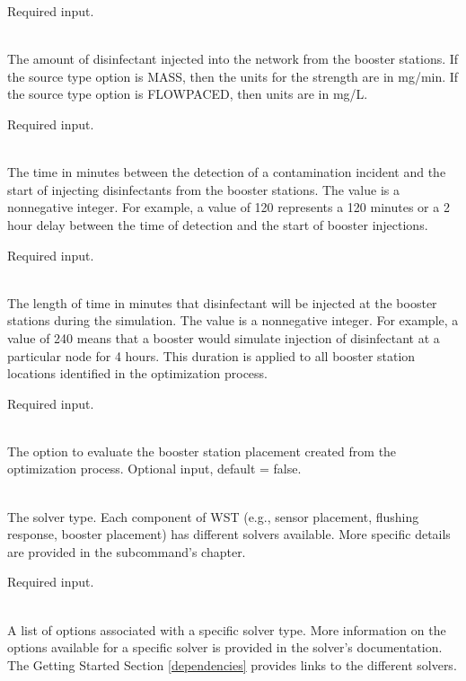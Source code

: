 \begin{description}[topsep=0pt,parsep=0.5em,itemsep=-0.4em]
\begin{description}[topsep=0pt,parsep=0.5em,itemsep=-0.4em]
                Required input.
    \item[{strength}]\hfill
\\The amount of disinfectant injected into the network from the booster stations.  
                If the source type option is MASS, then the units for the strength are in mg/min.  
                If the source type option is FLOWPACED, then units are in mg/L.
                
                Required input.
    \item[{response time}]\hfill
\\The time in minutes between the detection of a contamination incident and 
                the start of injecting disinfectants from the booster stations. The value 
                is a nonnegative integer. For example, a value of 120 represents 
                a 120 minutes or a 2 hour delay between the time of detection and 
                the start of booster injections.
				
                Required input.
    \item[{duration}]\hfill
\\The length of time in minutes that disinfectant will be injected at the booster 
                stations during the simulation.	The value is a nonnegative integer. For example, 
                a value of 240 means that a booster would simulate injection of disinfectant 
                at a particular node for 4 hours. This duration is applied to all booster 
                station locations identified in the optimization process.
				
                Required input.
    \item[{evaluate}]\hfill
      \\The option to evaluate the booster station placement created from
      the optimization process.
      Optional input, default = false.
  \end{description}
  \item[{solver}]\hfill
  \begin{description}[topsep=0pt,parsep=0.5em,itemsep=-0.4em]
    \item[{type}]\hfill
\\The solver type. Each component of WST
				(e.g., sensor placement, flushing response, booster 
				placement) has different 
				solvers available. More specific details are provided in 
				the subcommand's chapter.
                
                Required input.
    \item[{options}]\hfill
\\A list of options associated with a specific solver type. More
            information on the options available for a specific solver
            is provided in the solver's documentation. The Getting
            Started Section \ref{dependencies} provides links to the
            different solvers.
            

\end{description}
\end{description}
